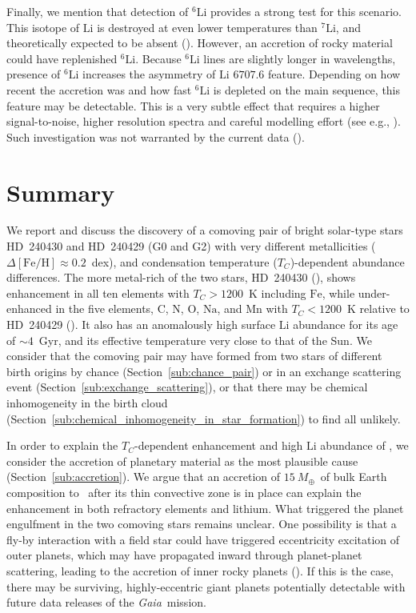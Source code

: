 \documentclass[modern, letterpaper]{aastex61}
\newcommand{\project}[1]{\textsl{#1}}
\newcommand{\gaia}{\project{Gaia}}
\newcommand{\sectionname}{Section}
\newcommand*\elem[1]{\ensuremath{\mathrm{#1}}}
\newcommand*\elemH[1]{\ensuremath{[\mathrm{#1}/\elem{H}]}}
\newcommand*{\feh}{\ensuremath{\elemH{Fe}}}
\newcommand{\sunanalog}{\text{Krios}}
\newcommand{\bizarreone}{\text{Kronos}}
\newcommand{\Tcondens}{\ensuremath{T_C}}
\newcommand{\mearth}{\ensuremath{M_\oplus}}
\newcommand{\maccreted}{\ensuremath{15~\mearth}}
\begin{document}
Finally, we mention that detection of $^6 \elem{Li}$ provides a strong test for
this scenario.
This isotope of \elem{Li} is destroyed at even lower temperatures than
$^7\elem{Li}$, and theoretically expected to be absent
(\citealt{1997ARA&A..35..557P}).
However, an accretion of rocky material could have replenished $^6 \elem{Li}$.
Because $^6\elem{Li}$ lines are slightly longer in wavelengths,
presence of $^6\elem{Li}$ increases the asymmetry of \elem{Li} $6707.6$ feature.
Depending on how recent the accretion was and how fast $^6 \elem{Li}$ is
depleted on the main sequence, this feature may be detectable.
This is a very subtle effect that requires a higher signal-to-noise, higher
resolution spectra and careful modelling effort
(see e.g., \citealt{Israelian:2001,2002MNRAS.335.1005R}).
Such investigation was not warranted by the current data (\citealt{jmlithium}).

\section{Summary}
\label{sec:summary}

We report and discuss the discovery of a comoving pair of bright
solar-type stars HD~240430 and HD~240429 (G0 and G2) with very different
metallicities ($\Delta\feh \approx 0.2$~dex), and condensation temperature
(\Tcondens)-dependent abundance differences.
The more metal-rich of the two stars, HD~240430 (\bizarreone), shows enhancement in
all ten elements with $\Tcondens > 1200$~K including \elem{Fe}, while
under-enhanced in the five elements, \elem{C}, \elem{N}, \elem{O}, \elem{Na}, and
\elem{Mn} with $\Tcondens < 1200$~K relative to HD~240429 (\sunanalog).
It also has an anomalously high surface \elem{Li} abundance for its age of
$\sim 4$~Gyr, and its effective temperature very close to that of the Sun.
We consider that the comoving pair may have formed from two stars of different
birth origins by chance (\sectionname~\ref{sub:chance_pair}) or in an exchange scattering event
(\sectionname~\ref{sub:exchange_scattering}), or that there may be chemical
inhomogeneity in the birth cloud
(\sectionname~\ref{sub:chemical_inhomogeneity_in_star_formation}) to find
all unlikely.

In order to explain the $\Tcondens$-dependent enhancement and high \elem{Li}
abundance of \bizarreone, we consider the accretion of planetary material as the
most plausible cause (\sectionname~\ref{sub:accretion}).
We argue that an accretion of \maccreted\ of bulk Earth composition to
\bizarreone\ after its thin convective zone is in place can explain the
enhancement in both refractory elements and lithium.
What triggered the planet engulfment in the two comoving stars remains unclear.
One possibility is that a fly-by interaction with a field star could have
triggered eccentricity excitation of outer planets, which may
have propagated inward through planet-planet scattering, leading to the
accretion of inner rocky planets (\citealt{Zakamska:2004aa,Malmberg:2011aa}).
If this is the case, there may be surviving, highly-eccentric giant planets
potentially detectable with future data releases of the \gaia\ mission.
\end{document}
